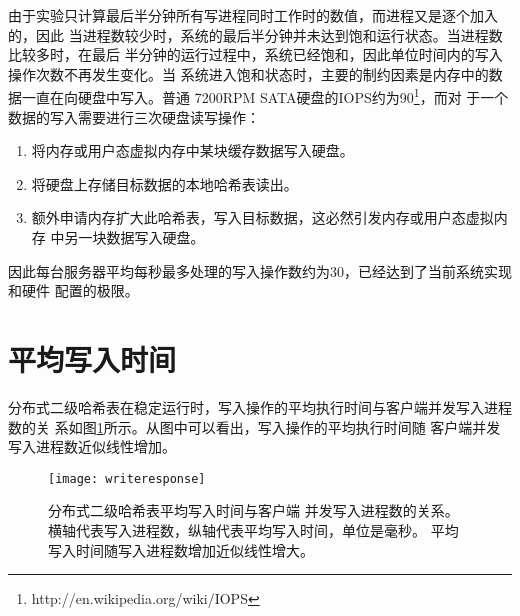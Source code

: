 由于实验只计算最后半分钟所有写进程同时工作时的数值，而进程又是逐个加入的，因此
当进程数较少时，系统的最后半分钟并未达到饱和运行状态。当进程数比较多时，在最后
半分钟的运行过程中，系统已经饱和，因此单位时间内的写入操作次数不再发生变化。当
系统进入饱和状态时，主要的制约因素是内存中的数据一直在向硬盘中写入。普通
7200RPM SATA硬盘的IOPS约为90\footnote{http://en.wikipedia.org/wiki/IOPS}，而对
于一个数据的写入需要进行三次硬盘读写操作：
\begin{enumerate}
  \item 将内存或用户态虚拟内存中某块缓存数据写入硬盘。
  \item 将硬盘上存储目标数据的本地哈希表读出。
  \item 额外申请内存扩大此哈希表，写入目标数据，这必然引发内存或用户态虚拟内存
  中另一块数据写入硬盘。
\end{enumerate}
因此每台服务器平均每秒最多处理的写入操作数约为30，已经达到了当前系统实现和硬件
配置的极限。

\section{平均写入时间}
分布式二级哈希表在稳定运行时，写入操作的平均执行时间与客户端并发写入进程数的关
系如图\ref{figure:writeresponse}所示。从图中可以看出，写入操作的平均执行时间随
客户端并发写入进程数近似线性增加。
\begin{figure}[htb]
  \centering
  \texttt{[image: writeresponse]}
  \caption[分布式二级哈希表平均写入时间]{分布式二级哈希表平均写入时间与客户端
  并发写入进程数的关系。横轴代表写入进程数，纵轴代表平均写入时间，单位是毫秒。
  平均写入时间随写入进程数增加近似线性增大。}
  \label{figure:writeresponse}
\end{figure}

